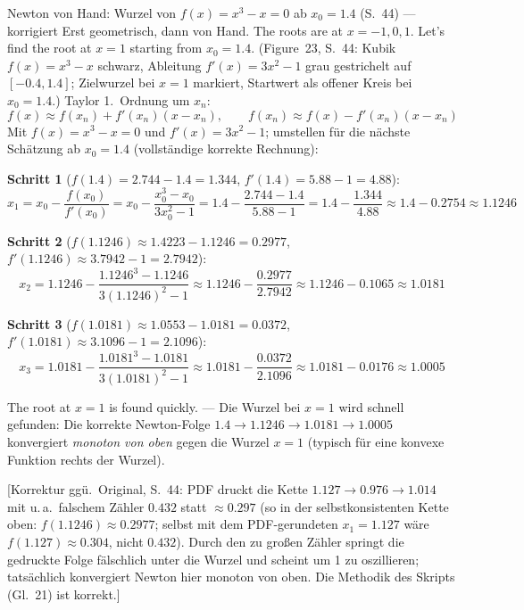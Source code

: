 \begin{bspbox}{Newton von Hand: Wurzel von $f(x) = x^3 - x = 0$ ab $x_0 = 1.4$ (S.~44) — korrigiert}
Erst geometrisch, dann von Hand. \glqq The roots are at $x = -1, 0, 1$. Let's find the root at $x = 1$ starting from $x_0 = 1.4$.\grqq{} (Figure~23, S.~44: Kubik $f(x) = x^3 - x$ schwarz, Ableitung $f'(x) = 3x^2 - 1$ grau gestrichelt auf $[-0.4, 1.4]$; Zielwurzel bei $x=1$ markiert, Startwert als offener Kreis bei $x_0 = 1.4$.) Taylor 1.~Ordnung um $x_n$:
\[ f(x) \approx f(x_n) + f'(x_n)(x - x_n), \qquad f(x_n) \approx f(x) - f'(x_n)(x - x_n) \]
Mit $f(x) = x^3 - x = 0$ und $f'(x) = 3x^2 - 1$; umstellen für die nächste Schätzung ab $x_0 = 1.4$ (vollständige korrekte Rechnung):

\textbf{Schritt 1} ($f(1.4) = 2.744 - 1.4 = 1.344$, $f'(1.4) = 5.88 - 1 = 4.88$):
\[ x_1 = x_0 - \frac{f(x_0)}{f'(x_0)} = x_0 - \frac{x_0^3 - x_0}{3x_0^2 - 1} = 1.4 - \frac{2.744 - 1.4}{5.88 - 1} = 1.4 - \frac{1.344}{4.88} \approx 1.4 - 0.2754 \approx 1.1246 \]

\textbf{Schritt 2} ($f(1.1246) \approx 1.4223 - 1.1246 = 0.2977$, $f'(1.1246) \approx 3.7942 - 1 = 2.7942$):
\[ x_2 = 1.1246 - \frac{1.1246^3 - 1.1246}{3(1.1246)^2 - 1} \approx 1.1246 - \frac{0.2977}{2.7942} \approx 1.1246 - 0.1065 \approx 1.0181 \]

\textbf{Schritt 3} ($f(1.0181) \approx 1.0553 - 1.0181 = 0.0372$, $f'(1.0181) \approx 3.1096 - 1 = 2.1096$):
\[ x_3 = 1.0181 - \frac{1.0181^3 - 1.0181}{3(1.0181)^2 - 1} \approx 1.0181 - \frac{0.0372}{2.1096} \approx 1.0181 - 0.0176 \approx 1.0005 \]

\glqq The root at $x = 1$ is found quickly.\grqq{} — Die Wurzel bei $x=1$ wird schnell gefunden: Die korrekte Newton-Folge $1.4 \to 1.1246 \to 1.0181 \to 1.0005$ konvergiert \emph{monoton von oben} gegen die Wurzel $x = 1$ (typisch für eine konvexe Funktion rechts der Wurzel).

[Korrektur ggü.\ Original, S.~44: PDF druckt die Kette $1.127 \to 0.976 \to 1.014$ mit u.\,a.\ falschem Zähler $0.432$ statt $\approx 0.297$ (so in der selbstkonsistenten Kette oben: $f(1.1246) \approx 0.2977$; selbst mit dem PDF-gerundeten $x_1 = 1.127$ wäre $f(1.127) \approx 0.304$, nicht $0.432$). Durch den zu großen Zähler springt die gedruckte Folge fälschlich unter die Wurzel und scheint um 1 zu oszillieren; tatsächlich konvergiert Newton hier monoton von oben. Die Methodik des Skripts (Gl.~21) ist korrekt.]
\end{bspbox}

